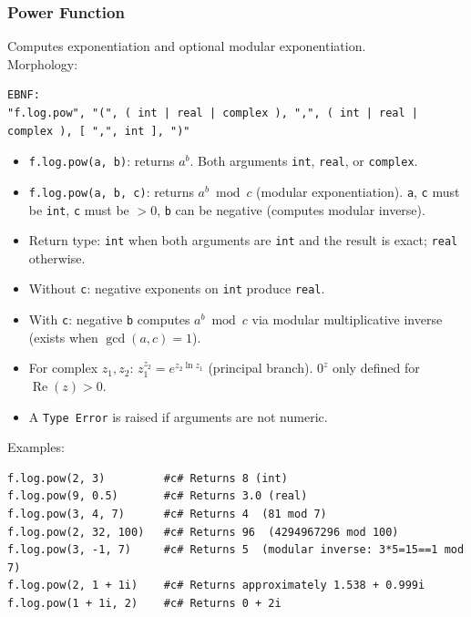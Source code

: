 \subsubsection{Power Function}
Computes exponentiation and optional modular exponentiation. \\
Morphology:
\begin{verbatim}
EBNF:
"f.log.pow", "(", ( int | real | complex ), ",", ( int | real | complex ), [ ",", int ], ")"
\end{verbatim}
\begin{itemize}
\item \texttt{f.log.pow(a, b)}: returns $a^b$. Both arguments \texttt{int}, \texttt{real}, or \texttt{complex}.
\item \texttt{f.log.pow(a, b, c)}: returns $a^b \bmod c$ (modular exponentiation). \texttt{a}, \texttt{c} must be \texttt{int}, \texttt{c} must be $> 0$, \texttt{b} can be negative (computes modular inverse).
\item Return type: \texttt{int} when both arguments are \texttt{int} and the result is exact; \texttt{real} otherwise.
\item Without \texttt{c}: negative exponents on \texttt{int} produce \texttt{real}.
\item With \texttt{c}: negative \texttt{b} computes $a^b \bmod c$ via modular multiplicative inverse (exists when $\gcd(a, c) = 1$).
\item For complex $z_1, z_2$: $z_1^{z_2} = e^{z_2 \ln z_1}$ (principal branch). $0^z$ only defined for $\operatorname{Re}(z) > 0$.
\item A \texttt{Type Error} is raised if arguments are not numeric.
\end{itemize}
Examples:
\begin{verbatim}
f.log.pow(2, 3)         #c# Returns 8 (int)
f.log.pow(9, 0.5)       #c# Returns 3.0 (real)
f.log.pow(3, 4, 7)      #c# Returns 4  (81 mod 7)
f.log.pow(2, 32, 100)   #c# Returns 96  (4294967296 mod 100)
f.log.pow(3, -1, 7)     #c# Returns 5  (modular inverse: 3*5=15==1 mod 7)
f.log.pow(2, 1 + 1i)    #c# Returns approximately 1.538 + 0.999i
f.log.pow(1 + 1i, 2)    #c# Returns 0 + 2i
\end{verbatim}

